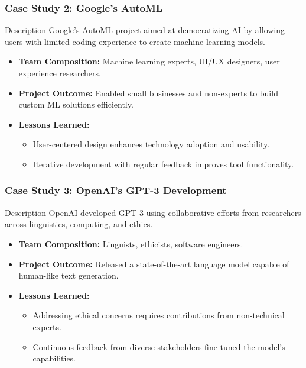\documentclass[aspectratio=169]{beamer}
\begin{document}
\begin{frame}[fragile]
    \frametitle{Case Study 2: Google's AutoML}
    \begin{block}{Description}
        Google's AutoML project aimed at democratizing AI by allowing users with limited coding experience to create machine learning models.
    \end{block}
    \begin{itemize}
        \item \textbf{Team Composition:} Machine learning experts, UI/UX designers, user experience researchers.
        \item \textbf{Project Outcome:} Enabled small businesses and non-experts to build custom ML solutions efficiently.
        \item \textbf{Lessons Learned:}
        \begin{itemize}
            \item User-centered design enhances technology adoption and usability.
            \item Iterative development with regular feedback improves tool functionality.
        \end{itemize}
    \end{itemize}
\end{frame}

\begin{frame}[fragile]
    \frametitle{Case Study 3: OpenAI's GPT-3 Development}
    \begin{block}{Description}
        OpenAI developed GPT-3 using collaborative efforts from researchers across linguistics, computing, and ethics.
    \end{block}
    \begin{itemize}
        \item \textbf{Team Composition:} Linguists, ethicists, software engineers.
        \item \textbf{Project Outcome:} Released a state-of-the-art language model capable of human-like text generation.
        \item \textbf{Lessons Learned:}
        \begin{itemize}
            \item Addressing ethical concerns requires contributions from non-technical experts.
            \item Continuous feedback from diverse stakeholders fine-tuned the model's capabilities.
        \end{itemize}
    \end{itemize}
\end{frame}
\end{document}
